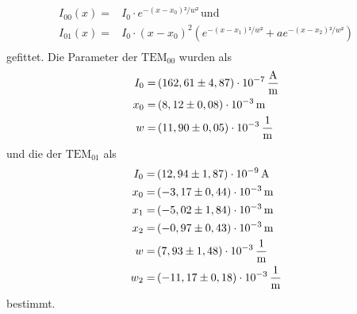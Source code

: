 \begin{align*}
    I_{00}(x) =& I_0 \cdot e^{-(x-x_0)²/w ²} \, \text{und} \\
    I_{01}(x) =& I_0 \cdot (x-x_{0})^2 \left( e^{-(x-x_1)²/w ²} + a e^{-(x-x_2)²/w ²} \right) \\
\end{align*}
gefittet.
Die Parameter der $\text{TEM}_{00}$  wurden als 
\begin{align*}
   I_0 =& \left( 162,61 \pm 4,87 \right) \cdot 10^{-7} \, \dfrac{\unit{\ampere}}{\unit{\meter}} \\
   x_0 =& \left( 8,12   \pm 0,08 \right) \cdot 10^{-3} \, \unit{\meter}                         \\
   w   =& \left(11,90   \pm 0,05 \right) \cdot 10^{-3} \, \unit{\dfrac{1}{\meter}}              \\
\end{align*}
und die der $\text{TEM}_{01}$ als
\begin{align*}
    I_0 =& \left( 12,94  \pm 1,87 \right) \cdot 10^{-9} \, \unit{\ampere}           \\
    x_0 =& \left( -3,17  \pm 0,44 \right) \cdot 10^{-3} \, \unit{\meter}            \\
    x_1 =& \left( -5,02  \pm 1,84 \right) \cdot 10^{-3} \, \unit{\meter}            \\
    x_2 =& \left( -0,97  \pm 0,43 \right) \cdot 10^{-3} \, \unit{\meter}            \\
    w   =& \left(  7,93  \pm 1,48 \right) \cdot 10^{-3} \, \unit{\dfrac{1}{\meter}} \\
    w_2 =& \left(-11,17  \pm 0,18 \right) \cdot 10^{-3} \, \unit{\dfrac{1}{\meter}} \\
 \end{align*}
 bestimmt.